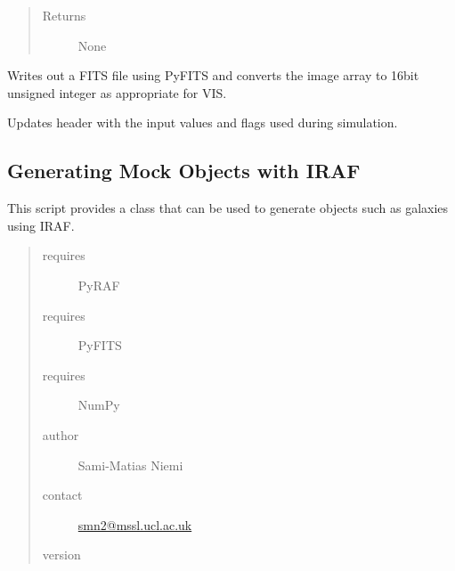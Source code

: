 \documentclass[a4paper,12pt,english]{sphinxmanual}
\begin{document}
\begin{fulllineitems}
\begin{fulllineitems}
\begin{quote}
\begin{description}
\item[{Returns}] \leavevmode
None

\end{description}\end{quote}

\end{fulllineitems}


\begin{fulllineitems}
\label{simulator:simulator.simulator.VISsimulator.writeOutputs}
Writes out a FITS file using PyFITS and converts the image array to 16bit unsigned integer as
appropriate for VIS.

Updates header with the input values and flags used during simulation.

\end{fulllineitems}


\end{fulllineitems}

\label{simulator:module-simulator.generateGalaxies}

\subsection{Generating Mock Objects with IRAF}
\label{simulator:generating-mock-objects-with-iraf}
This script provides a class that can be used to generate objects such as galaxies using IRAF.
\begin{quote}\begin{description}
\item[{requires}] \leavevmode
PyRAF

\item[{requires}] \leavevmode
PyFITS

\item[{requires}] \leavevmode
NumPy

\item[{author}] \leavevmode
Sami-Matias Niemi

\item[{contact}] \leavevmode
\href{mailto:smn2@mssl.ucl.ac.uk}{smn2@mssl.ucl.ac.uk}

\item[{version}] 

\end{description}\end{quote}
\end{document}
